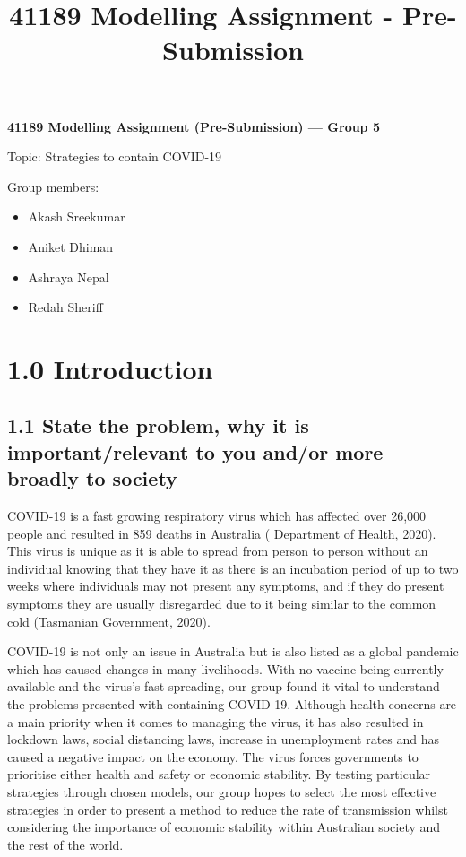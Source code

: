 \documentclass[11pt]{article}
\title{41189 Modelling Assignment - Pre-Submission}
\providecommand{\tightlist}{%
      \setlength{\itemsep}{0pt}\setlength{\parskip}{0pt}}
\begin{document}
    
    \maketitle
    
    

    
    \textbf{41189 Modelling Assignment (Pre-Submission) --- Group 5}

Topic: Strategies to contain COVID-19

Group members:

\begin{itemize}
\tightlist
\item
  Akash Sreekumar
\item
  Aniket Dhiman
\item
  Ashraya Nepal
\item
  Redah Sheriff
\end{itemize}

    \hypertarget{introduction}{%
\section{1.0 Introduction}\label{introduction}}

    \hypertarget{state-the-problem-why-it-is-importantrelevant-to-you-andor-more-broadly-to-society}{%
\subsection{1.1 State the problem, why it is important/relevant to you
and/or more broadly to
society}\label{state-the-problem-why-it-is-importantrelevant-to-you-andor-more-broadly-to-society}}

    COVID-19 is a fast growing respiratory virus which has affected over
26,000 people and resulted in 859 deaths in Australia ( Department of
Health, 2020). This virus is unique as it is able to spread from person
to person without an individual knowing that they have it as there is an
incubation period of up to two weeks where individuals may not present
any symptoms, and if they do present symptoms they are usually
disregarded due to it being similar to the common cold (Tasmanian
Government, 2020).

    COVID-19 is not only an issue in Australia but is also listed as a
global pandemic which has caused changes in many livelihoods. With no
vaccine being currently available and the virus's fast spreading, our
group found it vital to understand the problems presented with
containing COVID-19. Although health concerns are a main priority when
it comes to managing the virus, it has also resulted in lockdown laws,
social distancing laws, increase in unemployment rates and has caused a
negative impact on the economy. The virus forces governments to
prioritise either health and safety or economic stability. By testing
particular strategies through chosen models, our group hopes to select
the most effective strategies in order to present a method to reduce the
rate of transmission whilst considering the importance of economic
stability within Australian society and the rest of the world.
\end{document}
